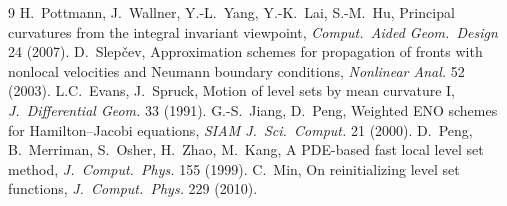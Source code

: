 \documentclass[11pt]{article}
\begin{document}
\begin{thebibliography}{9}
 H.~Pottmann, J.~Wallner, Y.-L.~Yang, Y.-K.~Lai, S.-M.~Hu, Principal curvatures from
the integral invariant viewpoint, \emph{Comput.\ Aided Geom.\ Design} 24 (2007).
 D.~Slep\v{c}ev, Approximation schemes for propagation of fronts with nonlocal
velocities and Neumann boundary conditions, \emph{Nonlinear Anal.} 52 (2003).
 L.C.~Evans, J.~Spruck, Motion of level sets by mean curvature I, \emph{J.\ Differential
Geom.} 33 (1991).
 G.-S.~Jiang, D.~Peng, Weighted ENO schemes for Hamilton--Jacobi equations, \emph{SIAM
J.\ Sci.\ Comput.} 21 (2000).
 D.~Peng, B.~Merriman, S.~Osher, H.~Zhao, M.~Kang, A PDE-based fast local level set method,
\emph{J.\ Comput.\ Phys.} 155 (1999).
 C.~Min, On reinitializing level set functions, \emph{J.\ Comput.\ Phys.} 229 (2010).
\end{thebibliography}
\end{document}
